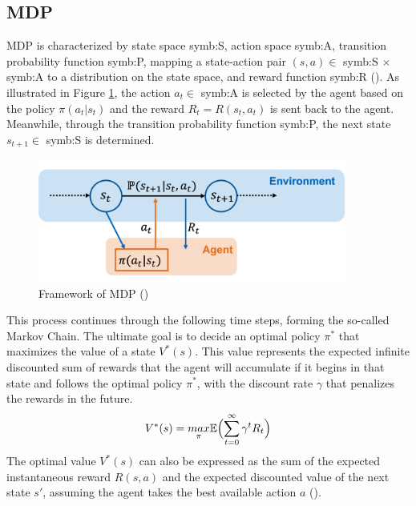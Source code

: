 \subsection{\acrfull{MDP}} \label{subsec:MDP}
 \acrfull{MDP} is characterized by state space \gls{symb:S}, action space \gls{symb:A}, transition probability function \gls{symb:P}, mapping a state-action pair $(s,a) \in $ \gls{symb:S} $\times$ \gls{symb:A} to a distribution on the state space, and reward function \gls{symb:R} (\cite{bellman1957markovian,kaelbling1996reinforcement,sutton2018reinforcement}). As illustrated in Figure \ref{fig:MDP}, the action $a_{t} \in$ \gls{symb:A} is selected by the agent based on the policy $\pi(a_{t}|s_{t})$ and the reward $R_{t} = R(s_{t},a_{t})$ is sent back to the agent. Meanwhile, through the transition probability function \gls{symb:P}, the next state $s_{t+1} \in$ \gls{symb:S} is determined.
\begin{figure}[h!]
\begin{center}
\includegraphics[width=0.9\textwidth]{LaTeX_Vorlagen_Studienarbeiten/images/MDP Framework.png}
\caption{Framework of \acrlong{MDP} (\cite{chen2022reinforcement})}
\label{fig:MDP}
\end{center}
\end{figure}
This process continues through the following time steps, forming the so-called Markov Chain. The ultimate goal is to decide an optimal policy $\pi^{*}$ that maximizes the value of a state $V^{*}(s)$. This value represents the expected infinite discounted sum of rewards that the agent will accumulate if it begins in that state and follows the optimal policy $\pi^{*}$, with the discount rate $\gamma$ that penalizes the rewards in the future.
\begin{equation*}
    V^{*}(s)=\underset{\pi}{max} \mathbb{E}\Bigl( \sum_{t=0}^{\infty}\gamma^{t}R_{t}\Bigr)
\end{equation*}
The optimal value $V^{*}(s)$ can also be expressed as the sum of the expected instantaneous reward $R(s,a)$ and the expected discounted value of the next state $s'$, assuming the agent takes the best available action $a$ (\cite{kaelbling1996reinforcement}).
